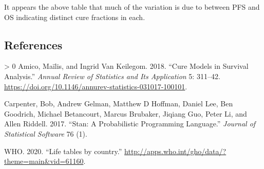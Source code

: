 \documentclass[
]{article}
\newlength{\cslhangindent}
\newenvironment{CSLReferences}[3] %
 {%
  \setlength{\parindent}{0pt}
  \ifodd #1 \everypar{\setlength{\hangindent}{\cslhangindent}}\ignorespaces\fi
  \ifnum #2 > 0
  \setlength{\parskip}{#2\baselineskip}
  \fi
 }%
 {}
\begin{document}
It appears the above table that much of the variation is due to between
PFS and OS indicating distinct cure fractions in each.

\hypertarget{references}{%
\subsection*{References}\label{references}}

\hypertarget{refs}{}
\begin{CSLReferences}{1}{0}
\leavevmode\hypertarget{ref-Amico2018}{}%
Amico, Maïlis, and Ingrid Van Keilegom. 2018. {``{Cure Models in
Survival Analysis}.''} \emph{Annual Review of Statistics and Its
Application} 5: 311--42.
\url{https://doi.org/10.1146/annurev-statistics-031017-100101}.

\leavevmode\hypertarget{ref-carpenter2017stan}{}%
Carpenter, Bob, Andrew Gelman, Matthew D Hoffman, Daniel Lee, Ben
Goodrich, Michael Betancourt, Marcus Brubaker, Jiqiang Guo, Peter Li,
and Allen Riddell. 2017. {``Stan: A Probabilistic Programming
Language.''} \emph{Journal of Statistical Software} 76 (1).

\leavevmode\hypertarget{ref-wholifetables}{}%
WHO. 2020. {``{Life tables by country}.''}
\url{http://apps.who.int/gho/data/?theme=main\&vid=61160}.

\end{CSLReferences}
\end{document}
